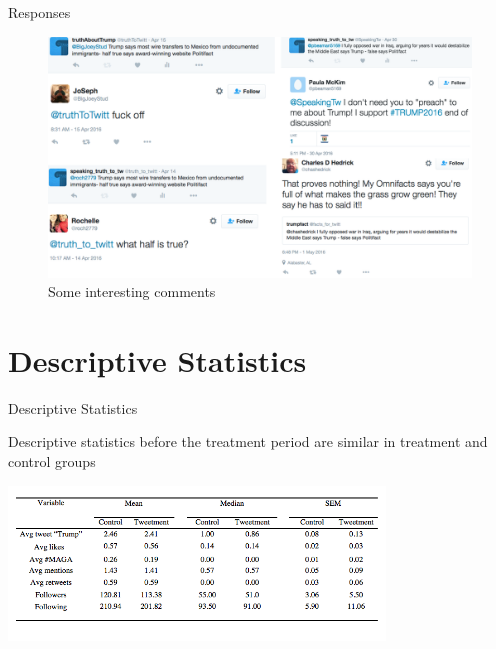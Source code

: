 \documentclass[10pt]{beamer}\usepackage[]{graphicx}\usepackage[]{color}
\begin{document}
\begin{frame}{Responses}
		\begin{figure}
			\begin{centering}
  	\includegraphics[scale=.45]{twitter_comment.PNG}
  \caption{Some interesting comments}
			\end{centering}
		\end{figure}
\end{frame}


\section{Descriptive Statistics}
\begin{frame}{Descriptive Statistics}

Descriptive statistics before the treatment period are similar in treatment and control groups

\begin{table}
\includegraphics[width=10cm]{../tables/descriptive.png}
\caption{Descriptive statistics before the treatment period}
\end{table}

% 
\end{frame}
\end{document}
